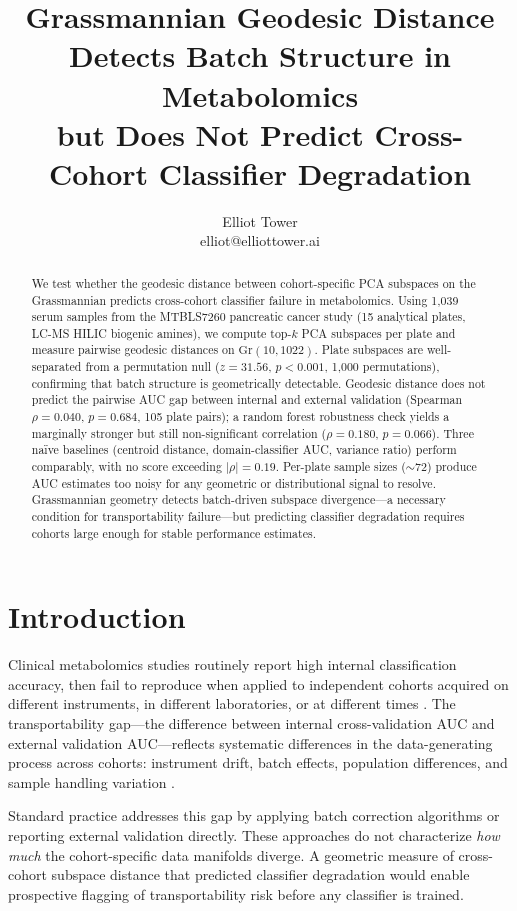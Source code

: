 \documentclass{article}
\title{Grassmannian Geodesic Distance Detects Batch Structure in Metabolomics\\but Does Not Predict Cross-Cohort Classifier Degradation}
\author{\name Elliot Tower \\
      \email elliot@elliottower.ai}
\begin{document}
\maketitle

\begin{abstract}
We test whether the geodesic distance between cohort-specific PCA subspaces on the Grassmannian predicts cross-cohort classifier failure in metabolomics. Using 1{,}039 serum samples from the MTBLS7260 pancreatic cancer study (15 analytical plates, LC-MS HILIC biogenic amines), we compute top-$k$ PCA subspaces per plate and measure pairwise geodesic distances on $\mathrm{Gr}(10, 1022)$. Plate subspaces are well-separated from a permutation null ($z = 31.56$, $p < 0.001$, 1{,}000 permutations), confirming that batch structure is geometrically detectable. Geodesic distance does not predict the pairwise AUC gap between internal and external validation (Spearman $\rho = 0.040$, $p = 0.684$, 105 plate pairs); a random forest robustness check yields a marginally stronger but still non-significant correlation ($\rho = 0.180$, $p = 0.066$). Three na\"{i}ve baselines (centroid distance, domain-classifier AUC, variance ratio) perform comparably, with no score exceeding $|\rho| = 0.19$. Per-plate sample sizes ($\sim$72) produce AUC estimates too noisy for any geometric or distributional signal to resolve. Grassmannian geometry detects batch-driven subspace divergence---a necessary condition for transportability failure---but predicting classifier degradation requires cohorts large enough for stable performance estimates.
\end{abstract}

\section{Introduction}

Clinical metabolomics studies routinely report high internal classification accuracy, then fail to reproduce when applied to independent cohorts acquired on different instruments, in different laboratories, or at different times \citep{broadhurst2006statistical}. The transportability gap---the difference between internal cross-validation AUC and external validation AUC---reflects systematic differences in the data-generating process across cohorts: instrument drift, batch effects, population differences, and sample handling variation \citep{wehrens2016improved}.

Standard practice addresses this gap by applying batch correction algorithms \citep{johnson2007adjusting} or reporting external validation directly. These approaches do not characterize \emph{how much} the cohort-specific data manifolds diverge. A geometric measure of cross-cohort subspace distance that predicted classifier degradation would enable prospective flagging of transportability risk before any classifier is trained.
\end{document}
